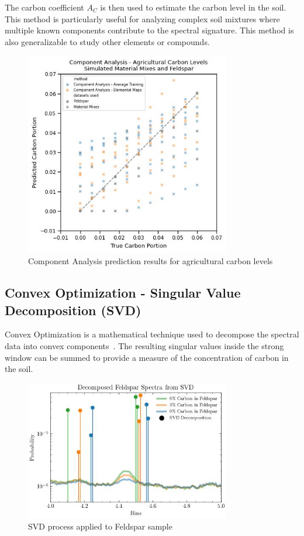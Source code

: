 \documentclass[review]{elsarticle}
\begin{document}
The carbon coefficient $A_C$ is then used to estimate the carbon level in the soil. This method is particularly useful for analyzing complex soil mixtures where multiple known components contribute to the spectral signature. This method is also generalizable to study other elements or compounds.

\begin{figure}[H]
\centering
\includegraphics[width=0.8\textwidth]{../Figures/Analysis/CA_Agricultural_Carbon_Levels.jpg}
\caption{Component Analysis prediction results for agricultural carbon levels}
\label{fig:component_analysis_results}
\end{figure}

\subsection{Convex Optimization - Singular Value Decomposition (SVD)}

Convex Optimization is a mathematical technique used to decompose the spectral data into convex components~\cite{liu_deconvolution_2020}. The resulting singular values inside the strong window can be summed to provide a measure of the concentration of carbon in the soil.

\begin{figure}[H]
\centering
\includegraphics[width=0.8\textwidth]{../Figures/Analysis/decomposed_feldspar_svd.jpg}
\caption{SVD process applied to Feldspar sample}
\label{fig:svd_decomposition}
\end{figure}
\end{document}
